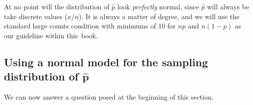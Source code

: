 At no point will the distribution of $\hat{p}$ look
\emph{perfectly} normal, since $\hat{p}$ will always
be take discrete values ($x / n$).
It is always a matter of degree, and we will use
the standard large counts condition with minimums
of 10 for $np$ and $n (1 - p)$ as our guideline
within this~book.
%

\newpage



\subsection[Using a normal model for the sampling distribution of $\hat{p}$]
           {Using a normal model for the sampling distribution of $\pmb{\hat{p}}$}

We can now answer a question posed at the beginning of this section.

